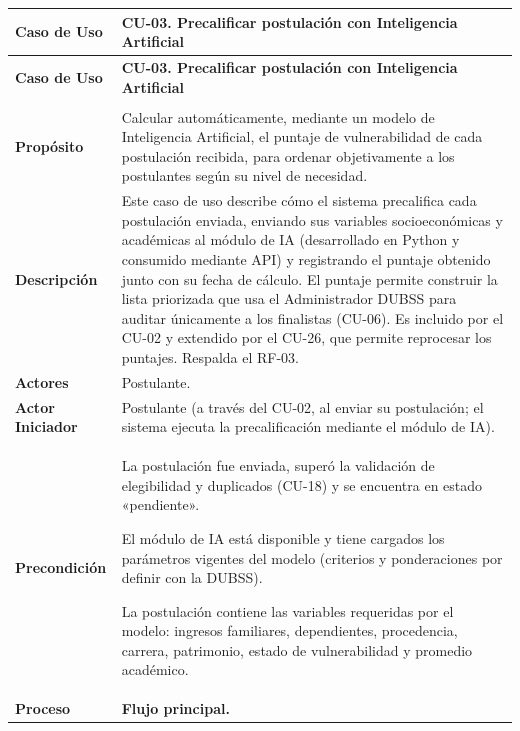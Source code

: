 \begin{longtable}{>{\raggedright\arraybackslash}p{2.9cm} >{\raggedright\arraybackslash}p{12.6cm}}
\toprule
\textbf{Caso de Uso} & \textbf{CU-03. Precalificar postulación con Inteligencia Artificial} \\
\midrule
\endfirsthead
\toprule
\textbf{Caso de Uso} & \textbf{CU-03. Precalificar postulación con Inteligencia Artificial} \\
\midrule
\endhead
\endfoot
\bottomrule
\multicolumn{2}{l}{\textit{Nota.} Elaboración propia.} \\
\endlastfoot
\textbf{Propósito} & Calcular automáticamente, mediante un modelo de Inteligencia Artificial, el puntaje de vulnerabilidad de cada postulación recibida, para ordenar objetivamente a los postulantes según su nivel de necesidad. \\
\midrule
\textbf{Descripción} & Este caso de uso describe cómo el sistema precalifica cada postulación enviada, enviando sus variables socioeconómicas y académicas al módulo de IA (desarrollado en Python y consumido mediante API) y registrando el puntaje obtenido junto con su fecha de cálculo. El puntaje permite construir la lista priorizada que usa el Administrador DUBSS para auditar únicamente a los finalistas (CU-06). Es incluido por el CU-02 y extendido por el CU-26, que permite reprocesar los puntajes. Respalda el RF-03. \\
\midrule
\textbf{Actores} & Postulante. \\
\midrule
\textbf{Actor Iniciador} & Postulante (a través del CU-02, al enviar su postulación; el sistema ejecuta la precalificación mediante el módulo de IA). \\
\midrule
\textbf{Precondición} & \vspace{-\baselineskip}\begin{cuvin}
    \item La postulación fue enviada, superó la validación de elegibilidad y duplicados (CU-18) y se encuentra en estado «pendiente».
    \item El módulo de IA está disponible y tiene cargados los parámetros vigentes del modelo (criterios y ponderaciones por definir con la DUBSS).
    \item La postulación contiene las variables requeridas por el modelo: ingresos familiares, dependientes, procedencia, carrera, patrimonio, estado de vulnerabilidad y promedio académico.
\end{cuvin} \\
\midrule
\textbf{Proceso} & \textbf{Flujo principal.}

\end{longtable}
